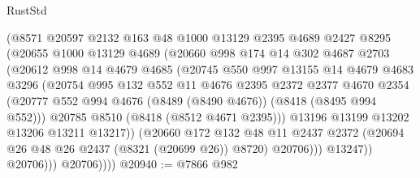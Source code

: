 \begin{lexlean}{RustStd}
\begin{coremodule}
                    (@8571
                      @20597
                      @2132
                      @163
                      @48
                      @1000
                      @13129
                      @2395
                      @4689
                      @2427
                      @8295
                      (@20655
                        @1000
                        @13129
                        @4689
                        (@20660
                          @998
                          @174
                          @14
                          @302
                          @4687
                          @2703
                          (@20612
                            @998
                            @14
                            @4679
                            @4685
                            (@20745
                              @550
                              @997
                              @13155
                              @14
                              @4679
                              @4683
                              @3296
                              (@20754
                                @995
                                @132
                                @552
                                @11
                                @4676
                                @2395
                                @2372
                                @2377
                                @4670
                                @2354
                                (@20777
                                  @552
                                  @994
                                  @4676
                                  (@8489 (@8490 @4676))
                                  (@8418 (@8495 @994 @552)))
                                @20785
                                @8510
                                (@8418 (@8512 @4671 @2395)))
                              @13196
                              @13199
                              @13202
                              @13206
                              @13211
                              @13217))
                          (@20660
                            @172
                            @132
                            @48
                            @11
                            @2437
                            @2372
                            (@20694 @26 @48 @26 @2437 (@8321 (@20699 @26)) @8720)
                            @20706)))
                      @13247))
                  @20706)))
            @20706))))
@20940 := @7866 @982

\end{coremodule}
\end{lexlean}

